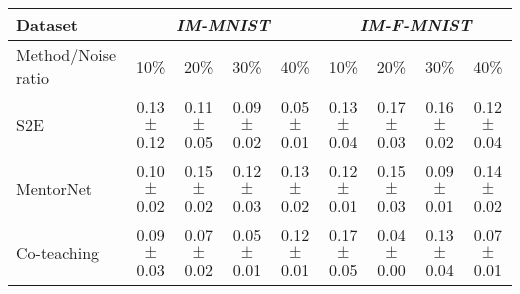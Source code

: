 \documentclass[11pt]{article}
\begin{document}
\begin{table}[!h]
    \small
\centering
	\begin{tabular}{l |cccc|cccc} 
		\Xhline{3\arrayrulewidth}	 	
		   Dataset &\multicolumn{4}{c|}{\textit{IM-MNIST}}&\multicolumn{4}{c}{\textit{IM-F-MNIST}}\\
			\hline
		   Method/Noise ratio & 10\% & 20\%& 30\% & 40\% & 10\% & 20\%& 30\% & 40\%\\
			\hline
			S2E & \makecell{0.13\\ $\pm$\scriptsize{0.12}} &\makecell{0.11\\ $\pm$\scriptsize{0.05}} & \makecell{0.09\\ $\pm$\scriptsize{0.02}} & \makecell{0.05\\ $\pm$\scriptsize{0.01}} & \makecell{0.13\\ $\pm$\scriptsize{0.04}} & \makecell{0.17\\ $\pm$\scriptsize{0.03}} & \makecell{0.16\\ $\pm$\scriptsize{0.02}} &  \makecell{0.12\\ $\pm$\scriptsize{0.04}}\\
			\hline
			MentorNet & \makecell{0.10\\ $\pm$\scriptsize{0.02}} & \makecell{0.15\\ $\pm$\scriptsize{0.02}} & \makecell{0.12\\ $\pm$\scriptsize{0.03}} & \makecell{0.13\\ $\pm$\scriptsize{0.02}} &  \makecell{0.12\\ $\pm$\scriptsize{0.01}} &  \makecell{0.15\\ $\pm$\scriptsize{0.03}} &  \makecell{0.09\\ $\pm$\scriptsize{0.01}} &  \makecell{0.14\\ $\pm$\scriptsize{0.02}}\\
			\hline
			Co-teaching & \makecell{0.09\\ $\pm$\scriptsize{0.03}} & \makecell{0.07\\ $\pm$\scriptsize{0.02}} & \makecell{0.05\\ $\pm$\scriptsize{0.01}} & \makecell{0.12\\ $\pm$\scriptsize{0.01}} & \makecell{0.17\\ $\pm$\scriptsize{0.05}} & \makecell{0.04\\ $\pm$\scriptsize{0.00}} & \makecell{0.13\\ $\pm$\scriptsize{0.04}} & \makecell{0.07\\ $\pm$\scriptsize{0.01}}\\

\end{tabular}
\end{table}
\end{document}
